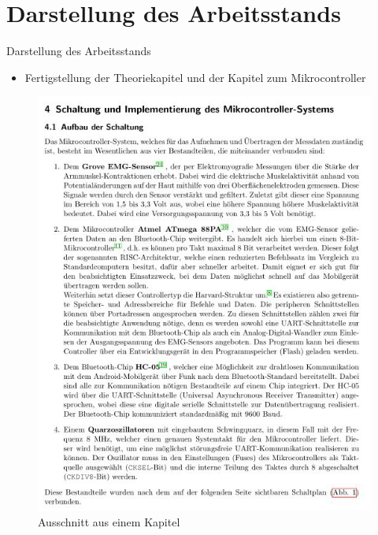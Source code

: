 \documentclass[hyphens]{beamer}
\begin{document}
 \section{Darstellung des Arbeitsstands}
 \begin{frame}{Darstellung des Arbeitsstands}
 \begin{itemize}
 \item Fertigstellung der Theoriekapitel und der Kapitel zum Mikrocontroller
 \end{itemize}
 \begin{figure}
 \includegraphics[scale=0.4]{img/kapitel}
 \caption{Ausschnitt aus einem Kapitel}
 \end{figure}
 \end{frame}
\end{document}
